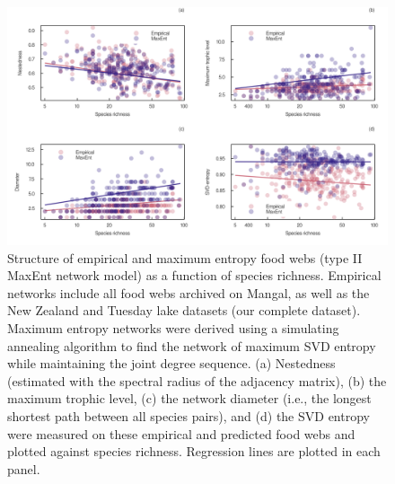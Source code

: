 \documentclass[
  12pt,
]{article}
\begin{document}
\begin{figure}
\hypertarget{fig:measures_richness}{%
\centering
\includegraphics{figures/measures_richness.png}
\caption{Structure of empirical and maximum entropy food webs (type II
MaxEnt network model) as a function of species richness. Empirical
networks include all food webs archived on Mangal, as well as the New
Zealand and Tuesday lake datasets (our complete dataset). Maximum
entropy networks were derived using a simulating annealing algorithm to
find the network of maximum SVD entropy while maintaining the joint
degree sequence. (a) Nestedness (estimated with the spectral radius of
the adjacency matrix), (b) the maximum trophic level, (c) the network
diameter (i.e., the longest shortest path between all species pairs),
and (d) the SVD entropy were measured on these empirical and predicted
food webs and plotted against species richness. Regression lines are
plotted in each panel.}\label{fig:measures_richness}
}
\end{figure}
\end{document}
